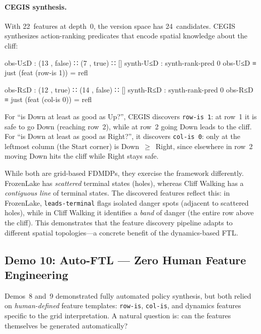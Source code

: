 \paragraph{CEGIS synthesis.}
With 22~features at depth~0, the version space has 24~candidates.  CEGIS synthesizes action-ranking predicates that encode spatial knowledge about the cliff:

\begin{spec}
obs-U≤D : (13 , false) ∷ (7 , true) ∷ []
synth-U≤D : synth-rank-pred 0 obs-U≤D ≡ just (feat (row-is 1))  = refl

obs-R≤D : (12 , true) ∷ (14 , false) ∷ []
synth-R≤D : synth-rank-pred 0 obs-R≤D ≡ just (feat (col-is 0))  = refl
\end{spec}

\noindent For ``is Down at least as good as Up?'', CEGIS discovers \texttt{row-is~1}: at row~1 it is safe to go Down (reaching row~2), while at row~2 going Down leads to the cliff.  For ``is Down at least as good as Right?'', it discovers \texttt{col-is~0}: only at the leftmost column (the Start corner) is Down~$\geq$~Right, since elsewhere in row~2 moving Down hits the cliff while Right stays safe.

\begin{remark}
While both are grid-based FDMDPs, they exercise the framework differently.  FrozenLake has \emph{scattered} terminal states (holes), whereas Cliff Walking has a \emph{contiguous line} of terminal states.  The discovered features reflect this: in FrozenLake, \texttt{leads-terminal} flags isolated danger spots (adjacent to scattered holes), while in Cliff Walking it identifies a \emph{band} of danger (the entire row above the cliff).  This demonstrates that the feature discovery pipeline adapts to different spatial topologies---a concrete benefit of the dynamics-based FTL.
\end{remark}


\subsection{Demo 10: Auto-FTL --- Zero Human Feature Engineering}
\label{sec:e2e-autoftl}

Demos~8 and~9 demonstrated fully automated policy synthesis, but both relied on \emph{human-defined} feature templates: \texttt{row-is}, \texttt{col-is}, and dynamics features specific to the grid interpretation.  A natural question is: can the features themselves be generated automatically?

